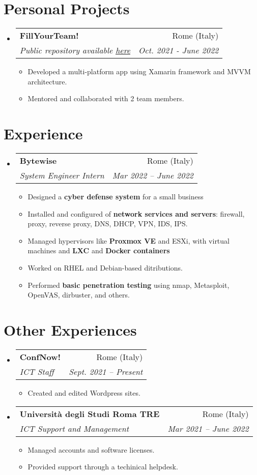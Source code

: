 \documentclass[letterpaper,11pt]{article}
\makeatletter
\newcommand{\resumeItem}[1]{
  \item\small{
    {#1 \vspace{-2pt}}
  }
}
\newcommand{\resumeSubheading}[4]{
  \vspace{-2pt}\item
    \begin{tabular*}{0.97\textwidth}[t]{l@{\extracolsep{\fill}}r}
      \textbf{#1} & #2 \\
      \textit{\small#3} & \textit{\small #4} \\
    \end{tabular*}\vspace{-7pt}
}
\newcommand{\resumeSubHeadingListStart}{\begin{itemize}[leftmargin=0.15in, label={}]}
\newcommand{\resumeSubHeadingListEnd}{\end{itemize}}
\newcommand{\resumeItemListStart}{\begin{itemize}}
\newcommand{\resumeItemListEnd}{\end{itemize}\vspace{-5pt}}
\makeatother
\begin{document}
\section{Personal Projects}
\resumeSubHeadingListStart
\resumeSubheading
{FillYourTeam!}{Rome (Italy)}
{Public repository available \href{https://github.com/filippovisconti/mcproject}{\underline{here}} }{Oct. 2021 - June 2022}
\resumeItemListStart
\resumeItem{Developed a multi-platform app using Xamarin framework and MVVM architecture.}
\resumeItem{Mentored and collaborated with 2 team members.}
\resumeItemListEnd


\resumeSubHeadingListEnd

\section{Experience}
\resumeSubHeadingListStart


\resumeSubheading
{Bytewise}{Rome (Italy)}
{System Engineer Intern}{Mar 2022 -- June 2022}
\resumeItemListStart
\resumeItem{Designed a \textbf{cyber defense system} for a small business}
\resumeItem{Installed and configured of \textbf{network services and servers}: firewall, proxy, reverse proxy, DNS, DHCP, VPN, IDS, IPS.}
\resumeItem{Managed hypervisors like \textbf{Proxmox VE} and ESXi, with virtual machines and \textbf{LXC} and \textbf{Docker containers}}
\resumeItem{Worked on RHEL and Debian-based ditributions.}
\resumeItem{Performed \textbf{basic penetration testing} using nmap, Metasploit, OpenVAS, dirbuster, and others.}
\resumeItemListEnd


\resumeSubHeadingListEnd

\section{Other Experiences}
\resumeSubHeadingListStart

\resumeSubheading
{ConfNow!}{Rome (Italy)}
{ICT Staff}{\textit{Sept. 2021 -- Present}}
\resumeItemListStart
\resumeItem
{Created and edited Wordpress sites.}
\resumeItemListEnd

\resumeSubheading
{Università degli Studi Roma TRE}{Rome (Italy)}
{ICT Support and Management}{Mar 2021 -- June 2022}
\resumeItemListStart
\resumeItem{Managed accounts and software licenses.}
\resumeItem{Provided support through a techinical helpdesk.}
\resumeItemListEnd
\resumeSubHeadingListEnd
\end{document}
